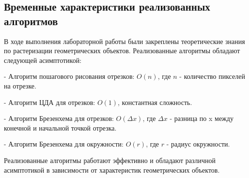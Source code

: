 \documentclass{article}
\begin{document}
    \subsection{Временные характеристики реализованных алгоритмов}
    В ходе выполнения лабораторной работы были закреплены теоретические знания по растеризации геометрических объектов. Реализованные алгоритмы обладают следующей асимптотикой:

    - Алгоритм пошагового рисования отрезков: \(O(n)\), где \(n\) - количество пикселей на отрезке.

    - Алгоритм ЦДА для отрезков: \(O(1)\), константная сложность.

    - Алгоритм Брезенхема для отрезков: \(O(\Delta x)\), где \(\Delta x\) - разница по x между конечной и начальной точкой отрезка.

    - Алгоритм Брезенхема для окружности: \(O(r)\), где \(r\) - радиус окружности.

    Реализованные алгоритмы работают эффективно и обладают различной асимптотикой в зависимости от характеристик геометрических объектов.
\end{document}
